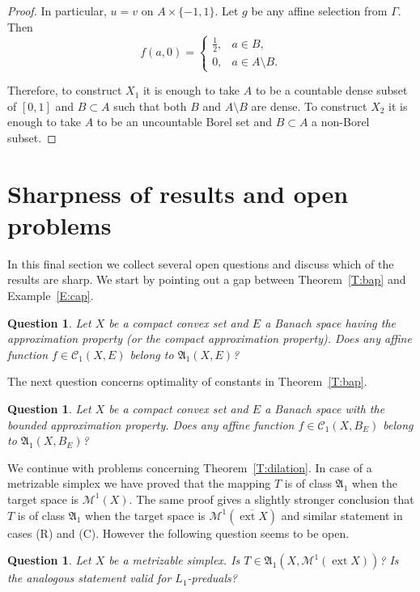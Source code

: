 \documentclass{amsart}
\numberwithin{equation}{section}
\newtheorem{question}[thm]{Question}
\theoremstyle{definition}
\def\fra{\mathfrak{A}}
\def\C{\mathcal C}
\def\M{\mathcal M}
\def\ov{\overline}
\def \ext {\operatorname{ext}}
\begin{document}
\begin{proof}
In particular, $u=v$ on $A\times\{-1,1\}$. Let $g$ be any affine selection from $\Gamma$. Then
$$f(a,0)=\begin{cases} \frac12, & a\in B,\\ 0, & a\in A\setminus B.\end{cases}$$

Therefore, to construct $X_1$ it is enough to take $A$ to be a countable dense subset of $[0,1]$ and $B\subset A$ such that both $B$ and $A\setminus B$ are dense. To construct $X_2$ it is enough to take $A$ to be an uncountable Borel set and $B\subset A$ a non-Borel subset.
\end{proof}

\section{Sharpness of results and open problems}

In this final section we collect several open questions and discuss which of the results are sharp.
We start by pointing out a gap between Theorem~\ref{T:bap} and Example~\ref{E:cap}.

\begin{question} Let $X$ be a compact convex set and $E$ a Banach space having the approximation property
(or the compact approximation property). Does any affine function $f\in\C_1(X,E)$ belong to $\fra_1(X,E)$?
\end{question}

The next question concerns optimality of constants in Theorem~\ref{T:bap}.

\begin{question} Let $X$ be a compact convex set and $E$ a Banach space with the bounded approximation property.
Does any affine function $f\in\C_1(X,B_E)$ belong to $\fra_1(X,B_E)$? 
\end{question}

We continue with problems concerning Theorem~\ref{T:dilation}. In case of a  metrizable simplex we have proved that the mapping $T$ is of class $\fra_1$ when the target space is $\M^1(X)$. The same proof gives a slightly stronger conclusion that $T$ is of class $\fra_1$ when the target space is $\M^1(\ov{\ext X})$ and similar statement in cases (R) and (C). However the following question seems to be open.

\begin{question} Let $X$ be a metrizable simplex. Is $T\in\fra_1(X,\M^1(\ext X))$? Is the analogous statement valid for $L_1$-preduals?
\end{question}
\end{document}
